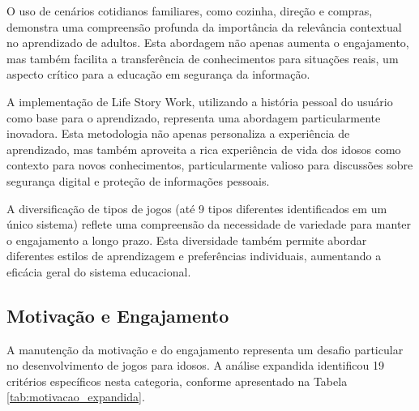 \begin{table}[H]
O uso de cenários cotidianos familiares, como cozinha, direção e compras, demonstra uma compreensão profunda da importância da relevância contextual no aprendizado de adultos. Esta abordagem não apenas aumenta o engajamento, mas também facilita a transferência de conhecimentos para situações reais, um aspecto crítico para a educação em segurança da informação.

A implementação de Life Story Work, utilizando a história pessoal do usuário como base para o aprendizado, representa uma abordagem particularmente inovadora. Esta metodologia não apenas personaliza a experiência de aprendizado, mas também aproveita a rica experiência de vida dos idosos como contexto para novos conhecimentos, particularmente valioso para discussões sobre segurança digital e proteção de informações pessoais.

A diversificação de tipos de jogos (até 9 tipos diferentes identificados em um único sistema) reflete uma compreensão da necessidade de variedade para manter o engajamento a longo prazo. Esta diversidade também permite abordar diferentes estilos de aprendizagem e preferências individuais, aumentando a eficácia geral do sistema educacional.

\subsection{Motivação e Engajamento}
\label{subsec:motivacao_expandida}

A manutenção da motivação e do engajamento representa um desafio particular no desenvolvimento de jogos para idosos. A análise expandida identificou 19 critérios específicos nesta categoria, conforme apresentado na Tabela \ref{tab:motivacao_expandida}.


\end{table}
